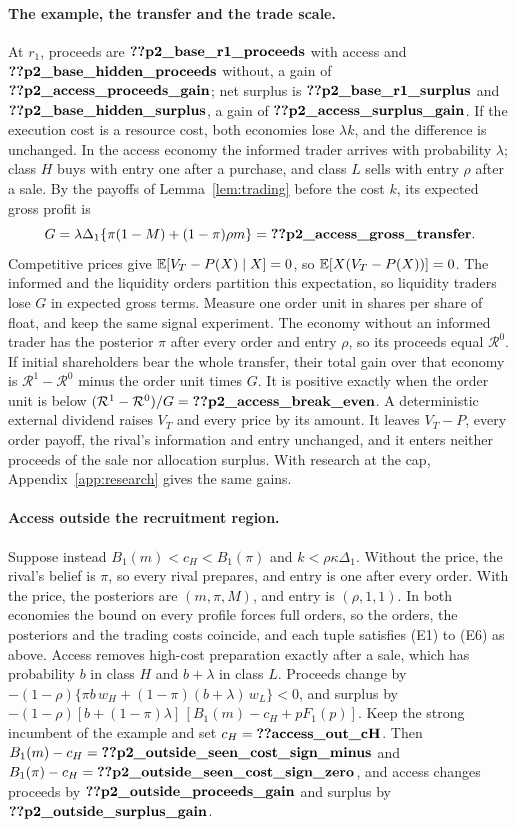 \paragraph{The example, the transfer and the trade scale.}
At \(r_1\), proceeds are \(\reg{p2_base_r1_proceeds}\) with access and \(\reg{p2_base_hidden_proceeds}\) without, a gain of
\(\reg{p2_access_proceeds_gain}\); net surplus is \(\reg{p2_base_r1_surplus}\) and \(\reg{p2_base_hidden_surplus}\), a gain of
\(\reg{p2_access_surplus_gain}\). If the execution cost is a resource cost, both economies lose \(\lambda k\), and the
difference is unchanged. In the access economy the informed trader arrives with probability \(\lambda\); class \(H\) buys
with entry one after a purchase, and class \(L\) sells with entry \(\rho\) after a sale. By the payoffs of
Lemma~\ref{lem:trading} before the cost \(k\), its expected gross profit is
\[
G=\lambda\Delta_1\{\pi(1-M)+(1-\pi)\rho m\}=\reg{p2_access_gross_transfer}.
\]
Competitive prices give \(\mathbb{E}[V_T-P(X)\mid X]=0\), so \(\mathbb{E}[X(V_T-P(X))]=0\). The informed and the liquidity orders
partition this expectation, so liquidity traders lose \(G\) in expected gross terms. Measure one order unit in shares per share of float, and
keep the same signal experiment. The economy without an informed trader has the
posterior \(\pi\) after every order and entry \(\rho\), so its proceeds equal \(\mathcal R^0\). If initial shareholders
bear the whole transfer, their total gain over that economy is \(\mathcal R^1-\mathcal R^0\) minus the order unit
times \(G\). It is positive exactly when the order unit is below \((\mathcal R^1-\mathcal R^0)/G=\reg{p2_access_break_even}\). A deterministic external dividend raises \(V_T\)
and every price by its amount. It leaves \(V_T-P\), every order payoff, the rival's information and entry
unchanged, and it enters neither proceeds of the sale nor allocation surplus. With research at the cap,
Appendix~\ref{app:research} gives the same gains.

\paragraph{Access outside the recruitment region.}
Suppose instead \(B_1(m)<c_H<B_1(\pi)\) and \(k<\rho\kappa\Delta_1\). Without the price, the rival's belief is
\(\pi\), so every rival prepares, and entry is one after every order. With the price, the posteriors are
\((m,\pi,M)\), and entry is \((\rho,1,1)\). In both economies the bound on every profile forces full orders, so the
orders, the posteriors and the trading costs coincide, and each tuple satisfies (E1) to (E6) as above. Access removes
high-cost preparation exactly after a sale, which has probability \(b\) in class \(H\) and \(b+\lambda\) in class
\(L\). Proceeds change by \(-(1-\rho)\{\pi b\,w_H+(1-\pi)(b+\lambda)\,w_L\}<0\), and surplus by
\(-(1-\rho)[b+(1-\pi)\lambda]\,[B_1(m)-c_H+pF_1(p)]\). Keep the strong incumbent of the example and set
\(c_H=\reg{access_out_cH}\). Then \(B_1(m)-c_H=\reg{p2_outside_seen_cost_sign_minus}\) and
\(B_1(\pi)-c_H=\reg{p2_outside_seen_cost_sign_zero}\), and access changes proceeds by \(\reg{p2_outside_proceeds_gain}\)
and surplus by \(\reg{p2_outside_surplus_gain}\).

